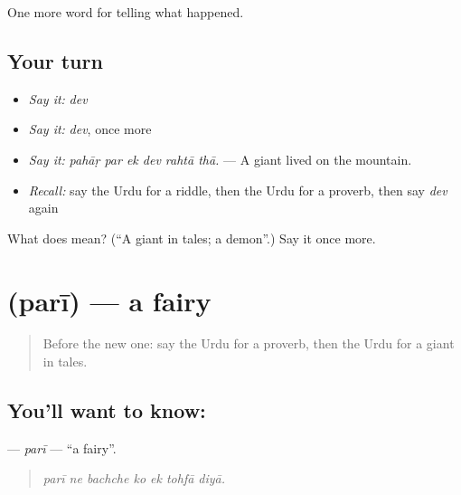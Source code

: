 \begin{grammarlens}[title={What you've built}]
One more word for telling what happened.
\end{grammarlens}

\subsection*{Your turn}
\begin{itemize}
\raggedright
  \item \emph{Say it:} \emph{dev}
  \item \emph{Say it:} \emph{dev}, once more
  \item \emph{Say it:} \emph{pahāṛ par ek dev rahtā thā.} — A giant lived on the mountain.
  \item \emph{Recall:} say the Urdu for a riddle, then the Urdu for a proverb, then say \emph{dev} again
\end{itemize}

\begin{tcolorbox}[breakable,colback=teal!4,colframe=teal!35!black,title={Before you move on}]
What does  mean? (\textquotedblleft{}A giant in tales; a demon\textquotedblright{}.) Say it once more.
\end{tcolorbox}
\section[\texorpdfstring{\ur{پری} (parī)}{پری (parī)}]{ (parī) — a fairy}

\label{lesson:UR-C325-pari}



\begin{quote}
Before the new one: say the Urdu for a proverb, then the Urdu for a giant in tales.
\end{quote}

\subsection*{You'll want to know: }
\textbf{} — \emph{parī} — \textquotedblleft{}a fairy\textquotedblright{}.

\begin{quote}
      
\end{quote}

\begin{quote}
\emph{parī ne bachche ko ek tohfā diyā.}
\end{quote}

